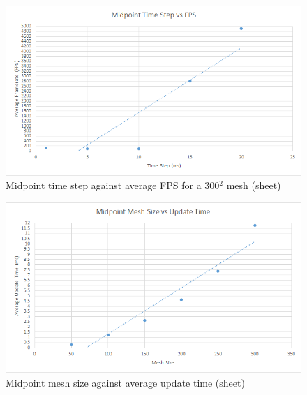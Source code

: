     \begin{figure}
    \begin{center}
      \includegraphics[scale=.9]{Figures/sheet_m_ts_fps}
    \end{center}
    \caption{Midpoint time step against average FPS for a 300$^{2}$ mesh (sheet)}
    \label{fig:m step fps sheet}
  \end{figure}
  
    \begin{figure}
    \begin{center}
      \includegraphics[scale=.9]{Figures/sheet_m_m_ut}
    \end{center}
    \caption{Midpoint mesh size against average update time (sheet)}
    \label{fig:m mesh update sheet}
  \end{figure}
  
